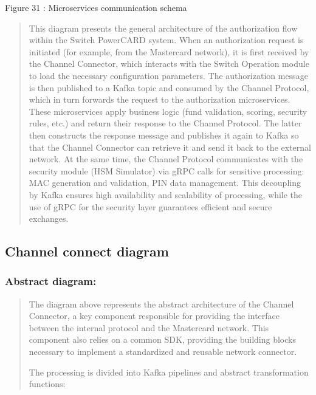 \documentclass[12pt,a4paper]{report}
\begin{document}
\protect\hypertarget{_Toc201954507}{}{}Figure 31 : Microservices
communication schema

\begin{quote}
This diagram presents the general architecture of the authorization flow
within the Switch PowerCARD system. When an authorization request is
initiated (for example, from the Mastercard network), it is first
received by the Channel Connector, which interacts with the Switch
Operation module to load the necessary configuration parameters. The
authorization message is then published to a Kafka topic and consumed by
the Channel Protocol, which in turn forwards the request to the
authorization microservices. These microservices apply business logic
(fund validation, scoring, security rules, etc.) and return their
response to the Channel Protocol. The latter then constructs the
response message and publishes it again to Kafka so that the Channel
Connector can retrieve it and send it back to the external network. At
the same time, the Channel Protocol communicates with the security
module (HSM Simulator) via gRPC calls for sensitive processing: MAC
generation and validation, PIN data management. This decoupling by Kafka
ensures high availability and scalability of processing, while the use
of gRPC for the security layer guarantees efficient and secure
exchanges.
\end{quote}

\hypertarget{channel-connect-diagram}{%
\subsection{\texorpdfstring{\textbf{Channel connect
diagram}}{Channel connect diagram}}\label{channel-connect-diagram}}

\hypertarget{abstract-diagram}{%
\subsubsection{\texorpdfstring{\textbf{Abstract
diagram:}}{Abstract diagram:}}\label{abstract-diagram}}

\begin{quote}
The diagram above represents the abstract architecture of the Channel
Connector, a key component responsible for providing the interface
between the internal protocol and the Mastercard network. This component
also relies on a common SDK, providing the building blocks necessary to
implement a standardized and reusable network connector.

The processing is divided into Kafka pipelines and abstract
transformation functions:
\end{quote}
\end{document}

